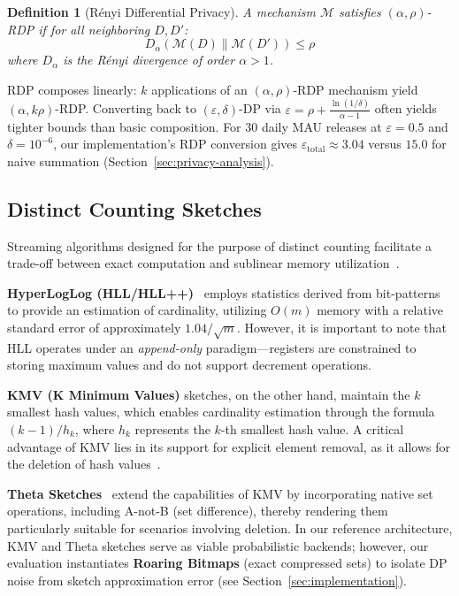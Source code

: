 \documentclass[sigconf,anonymous,review]{acmart}
\newtheorem{definition}[theorem]{Definition}
\begin{document}
\begin{definition}[Rényi Differential Privacy]
    A mechanism $\mathcal{M}$ satisfies $(\alpha, \rho)$-RDP if for all neighboring $D, D'$:
    \[
        D_\alpha(\mathcal{M}(D) \| \mathcal{M}(D')) \leq \rho
    \]
    where $D_\alpha$ is the Rényi divergence of order $\alpha > 1$.
\end{definition}

RDP composes linearly: $k$ applications of an $(\alpha, \rho)$-RDP mechanism yield $(\alpha, k\rho)$-RDP. Converting back to $(\varepsilon, \delta)$-DP via $\varepsilon = \rho + \frac{\ln(1/\delta)}{\alpha - 1}$ often yields tighter bounds than basic composition. For 30 daily MAU releases at $\varepsilon = 0.5$ and $\delta = 10^{-6}$, our implementation's RDP conversion gives $\varepsilon_{\text{total}} \approx 3.04$ versus $15.0$ for naive summation (Section~\ref{sec:privacy-analysis}).

\subsection{Distinct Counting Sketches}

Streaming algorithms designed for the purpose of distinct counting facilitate a trade-off between exact computation and sublinear memory utilization~\cite{Bar-Yossef2002, Cormode2005}.

\textbf{HyperLogLog (HLL/HLL++)}~\cite{Flajolet2007, Heule2013} employs statistics derived from bit-patterns to provide an estimation of cardinality, utilizing $O(m)$ memory with a relative standard error of approximately $1.04/\sqrt{m}$. However, it is important to note that HLL operates under an \emph{append-only} paradigm—registers are constrained to storing maximum values and do not support decrement operations.

\textbf{KMV (K Minimum Values)} sketches, on the other hand, maintain the $k$ smallest hash values, which enables cardinality estimation through the formula $(k-1)/h_k$, where $h_k$ represents the $k$-th smallest hash value. A critical advantage of KMV lies in its support for explicit element removal, as it allows for the deletion of hash values~\cite{Dasgupta2016}.

\textbf{Theta Sketches}~\cite{DataSketches} extend the capabilities of KMV by incorporating native set operations, including A-not-B (set difference), thereby rendering them particularly suitable for scenarios involving deletion. In our reference architecture, KMV and Theta sketches serve as viable probabilistic backends; however, our evaluation instantiates \textbf{Roaring Bitmaps} (exact compressed sets) to isolate DP noise from sketch approximation error (see Section~\ref{sec:implementation}).
\end{document}
